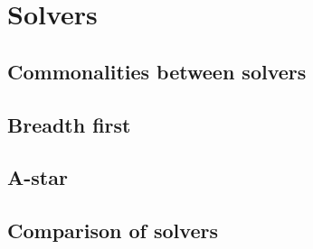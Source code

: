 \documentclass[../../main.tex]{subfiles}
\begin{document}
\section{Solvers}
\label{sub:solvers}


\subsection{Commonalities between solvers}%
\label{sub:commonalities}


\subsection{Breadth first}%
\label{sub:breadth_first}




\subsection{A-star}%
\label{sub:a_star}



\subsection{Comparison of solvers}%
\label{sub:comparison_of_solvers}




	
\end{document}
